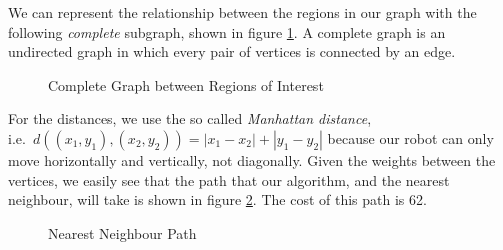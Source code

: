 We can represent the relationship between the regions in our graph with the following \textit{complete} subgraph, shown in figure \ref{fig:completeGraph}. A complete graph is an undirected graph in which every pair of vertices is connected by an edge. 
\begin{figure}
\centering
{}
\caption{Complete Graph between Regions of Interest}
\label{fig:completeGraph}
\end{figure}

For the distances, we use the so called \textit{Manhattan distance},\\ i.e.\ $d((x_1,y_1),(x_2,y_2)) = |x_1 - x_2| +| y_1 - y_2|$ because our robot can only move horizontally and vertically, not diagonally. Given the weights between the vertices, we easily see that the path that our algorithm, and the nearest neighbour, will take is shown in figure \ref{fig:pathOnComplete}. The cost of this path is 62.

\begin{figure}
\centering
{}
\caption{Nearest Neighbour Path}
\label{fig:pathOnComplete}
\end{figure}


